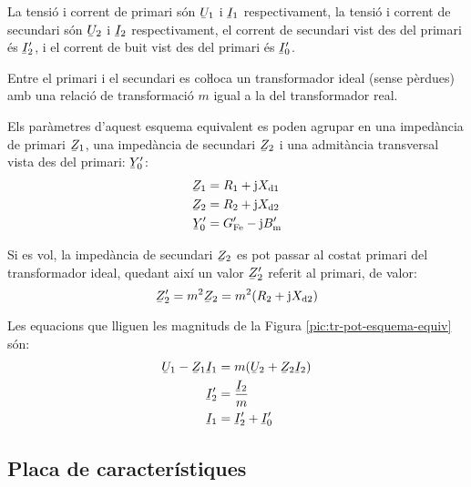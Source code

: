 La tensió i corrent de primari són $\cmplx{U}_1$ i $\cmplx{I}_1$ respectivament, la tensió i corrent de secundari són $\cmplx{U}_2$ i $\cmplx{I}_2$ respectivament, el corrent de secundari vist des del primari és $\cmplx{I}_2'$, i el corrent de buit vist des del primari és $\cmplx{I}_0'$.

Entre el primari i el secundari es coŀloca un transformador ideal (sense pèrdues) amb una relació de transformació $m$ igual a la del transformador real.

Els paràmetres d'aquest esquema equivalent es poden agrupar en una impedància de primari $\cmplx{Z}_1$, una impedància de secundari $\cmplx{Z}_2$ i una  admitància transversal vista des del primari: $\cmplx{Y}_0'$:
\begin{align}
    \cmplx{Z}_1 &= R_1 + \ju X\ped{d1} \\
    \cmplx{Z}_2 &= R_2 + \ju X\ped{d2}\\
    \cmplx{Y}_0' &= G\ped{Fe}'- \ju B\ped{m}'
\end{align}

Si es vol, la impedància de secundari $\cmplx{Z}_2$ es pot passar al costat primari del transformador ideal, quedant així un valor $\cmplx{Z}_2'$ referit al primari, de valor:
\begin{equation}
    \cmplx{Z}_2' = m^2 \cmplx{Z}_2 =  m^2 (R_2 + \ju X\ped{d2})
\end{equation}

Les equacions que lliguen les magnituds de la Figura \vref{pic:tr-pot-esquema-equiv} són:
\begin{align}
    \cmplx{U}_1 - \cmplx{Z}_1 \cmplx{I}_1 &= m ( \cmplx{U}_2  + \cmplx{Z}_2 \cmplx{I}_2 ) \\
    \cmplx{I}_2' &=   \frac{\cmplx{I}_2}{m} \\
    \cmplx{I}_1  &=   \cmplx{I}_2' + \cmplx{I}_0'
\end{align}


\subsection{Placa de característiques}

